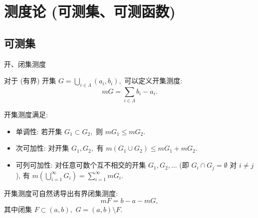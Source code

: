 
\section[测度论]{测度论 (可测集、可测函数)}


\subsection[可测集]{可测集}


\begin{frame}{开、闭集测度}

对于 (有界) 开集 $\displaystyle G = \bigcup_{i \in \Lambda} (a_i, b_i),$ 可以定义\alert{开集测度}:
\[m G = \sum_{i \in \Lambda} b_i - a_i.\]

\pause

开集测度满足:
\begin{itemize}
\item \alert{单调性}: 若开集 $G_1 \subset G_2,$ 则 $m G_1 \leqslant m G_2.$
\item \alert{次可加性}: 对开集 $G_1, G_2,$ 有 $m\left( G_1 \cup G_2 \right) \leqslant m G_1 + m G_2.$
\item \alert{可列可加性}: 对任意可数个互不相交的开集 $G_1, G_2, \dots$ (即 $G_i \cap G_j = \emptyset$ 对 $i \neq j$), 有 $\displaystyle m\left( \bigcup_{i=1}^{\infty} G_i \right) = \sum_{i=1}^{\infty} m G_i.$
\end{itemize}

\pause
\vspace{1em}

开集测度可自然诱导出有界\alert{闭集测度}:
\[m F = b -a - m G,\]
其中闭集 $F \subset (a, b),$ $G = (a, b) \setminus F.$

\end{frame}


